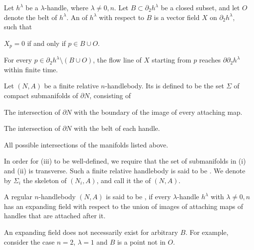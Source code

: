 \begin{definition}
    Let $h^\lambda$ be a $\lambda$-handle, where $\lambda\neq0,n$.
    Let $B\subset\partial_2h^\lambda$ be a closed subset,
    and let $O$ denote the belt of $h^\lambda$.
    An  of $h^\lambda$ with respect to $B$
    is a vector field $X$ on $\partial_2h^\lambda$, such that
    \begin{itms}
        \item $X_p=0$ if and only if $p\in B\cup O$.
        \item For every $p\in\partial_2h^\lambda\setminus(B\cup O)$,
        the flow line of $X$ starting from $p$ reaches $\partial\partial_2h^\lambda$ within finite time.
    \end{itms}
    
    Let $(N,A)$ be a finite relative $n$-handlebody.
    Its  is defined to be the set $\Sigma$ of compact submanifolds of $\partial N$,
    consisting of
    \begin{enum}
        \item The intersection of $\partial N$ with
        the boundary of the image of every attaching map.
        \item The intersection of $\partial N$ with
        the belt of each handle.
        \item All possible intersections of the manifolds listed above.
    \end{enum}
    In order for \textup{(iii)} to be well-defined, we require that
    the set of submanifolds in \textup{(i)} and \textup{(ii)} is transverse.
    Such a finite relative handlebody is said to be .
    We denote by $\Sigma_i$ the skeleton of $(N_i,A)$,
    and call it the  of $(N,A)$.
    
    A regular $n$-handlebody $(N,A)$ is said to be ,
    if every $\lambda$-handle $h^\lambda$ with $\lambda\neq0,n$ has an expanding field
    with respect to the union of images of attaching maps of handles
    that are attached after it. \varqed
\end{definition}

An expanding field does not necessarily exist for arbitrary $B$.
For example, consider the case $n=2$, $\lambda=1$ and $B$ is a point not in $O$.

